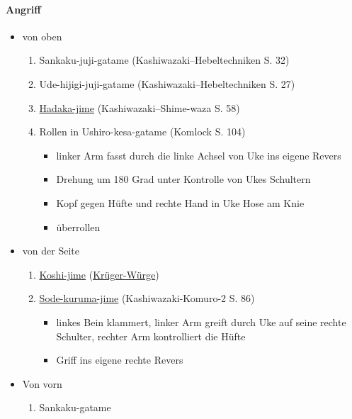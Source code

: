 \documentclass[justified, a4paper, notitlepage, captions=tableheading, nobib]{tufte-handout}
\begin{document}
\paragraph{Angriff}
\label{sec:orgd58050e}
\begin{itemize}
\item von oben
\begin{enumerate}
\item Sankaku-juji-gatame (Kashiwazaki--Hebeltechniken S. 32)
\item Ude-hijigi-juji-gatame (Kashiwazaki--Hebeltechniken S. 27)
\item \hyperref[orgddc1c5d]{Hadaka-jime} (Kashiwazaki--Shime-waza S. 58)
\item Rollen in Ushiro-kesa-gatame (Komlock S. 104)
\begin{itemize}
\item linker Arm fasst durch die linke Achsel von Uke ins eigene Revers
\item Drehung um 180 Grad unter Kontrolle von Ukes Schultern
\item Kopf gegen Hüfte und rechte Hand in Uke Hose am Knie
\item überrollen
\end{itemize}
\end{enumerate}
\item von der Seite
\begin{enumerate}
\item \hyperref[org2f19955]{Koshi-jime} (\hyperref[org7abb45a]{Krüger-Würge})
\item \hyperref[orgca7fe31]{Sode-kuruma-jime} (Kashiwazaki-Komuro-2 S. 86)
\begin{itemize}
\item linkes Bein klammert, linker Arm greift durch Uke auf seine rechte Schulter, rechter Arm kontrolliert die Hüfte
\item Griff ins eigene rechte Revers
\end{itemize}
\end{enumerate}
\item Von vorn
\begin{enumerate}
\item Sankaku-gatame
\end{enumerate}
\end{itemize}
\end{document}
